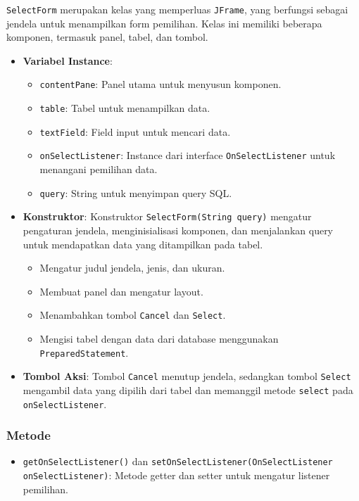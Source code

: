 \texttt{SelectForm} merupakan kelas yang memperluas \texttt{JFrame}, yang berfungsi sebagai jendela untuk menampilkan form pemilihan. Kelas ini memiliki beberapa komponen, termasuk panel, tabel, dan tombol.

\begin{itemize}
	\item \textbf{Variabel Instance}:
	\begin{itemize}
		\item \texttt{contentPane}: Panel utama untuk menyusun komponen.
		\item \texttt{table}: Tabel untuk menampilkan data.
		\item \texttt{textField}: Field input untuk mencari data.
		\item \texttt{onSelectListener}: Instance dari interface \texttt{OnSelectListener} untuk menangani pemilihan data.
		\item \texttt{query}: String untuk menyimpan query SQL.
	\end{itemize}
	
	\item \textbf{Konstruktor}:
	Konstruktor \texttt{SelectForm(String query)} mengatur pengaturan jendela, menginisialisasi komponen, dan menjalankan query untuk mendapatkan data yang ditampilkan pada tabel.
	\begin{itemize}
		\item Mengatur judul jendela, jenis, dan ukuran.
		\item Membuat panel dan mengatur layout.
		\item Menambahkan tombol \texttt{Cancel} dan \texttt{Select}.
		\item Mengisi tabel dengan data dari database menggunakan \texttt{PreparedStatement}.
	\end{itemize}
	
	\item \textbf{Tombol Aksi}:
	Tombol \texttt{Cancel} menutup jendela, sedangkan tombol \texttt{Select} mengambil data yang dipilih dari tabel dan memanggil metode \texttt{select} pada \texttt{onSelectListener}.
\end{itemize}

\subsubsection{Metode}

\begin{itemize}
	\item \texttt{getOnSelectListener()} dan \texttt{setOnSelectListener(OnSelectListener onSelectListener)}: Metode getter dan setter untuk mengatur listener pemilihan.
\end{itemize}


